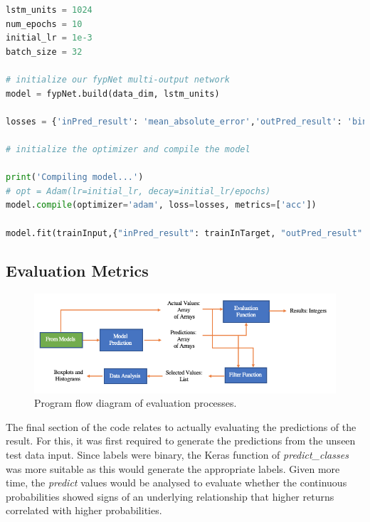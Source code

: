\documentclass[10pt,onecolumn,letterpaper]{article}
\begin{document}
\begin{lstlisting}[language=Python, breaklines=true, caption={Initialisation, compilation and training implementation for the multi output model}]
lstm_units = 1024
num_epochs = 10
initial_lr = 1e-3
batch_size = 32

# initialize our fypNet multi-output network
model = fypNet.build(data_dim, lstm_units)
 
losses = {'inPred_result': 'mean_absolute_error','outPred_result': 'binary_crossentropy'}
 
# initialize the optimizer and compile the model

print('Compiling model...')
# opt = Adam(lr=initial_lr, decay=initial_lr/epochs)
model.compile(optimizer='adam', loss=losses, metrics=['acc'])    

model.fit(trainInput,{"inPred_result": trainInTarget, "outPred_result": trainTarget}, validation_data=(valInput, {"inPred_result": trainValTarget, "outPred_result": valTarget}), batch_size = batch_size, Stateful=False, epochs=num_epochs, verbose=1)

\end{lstlisting} 

\subsection{Evaluation Metrics} 

\begin{figure}[!hbt!]
\centering
\includegraphics[width=\columnwidth]{evaluationflow.png}
\caption{Program flow diagram of evaluation processes.}
\label{evaluationflow}
\end{figure}

The final section of the code relates to actually evaluating the predictions of the result. For this, it was first required to generate the predictions from the unseen test data input. Since labels were binary, the Keras function of \textit{predict\_classes} was more suitable as this would generate the appropriate labels. Given more time, the \textit{predict} values would be analysed to evaluate whether the continuous probabilities showed signs of an underlying relationship that higher returns correlated with higher probabilities. 
\end{document}
